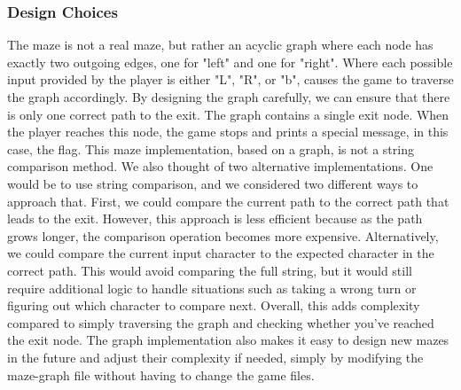



\subsubsection{Design Choices}

The maze is not a real maze, but rather an acyclic graph where each node has exactly two outgoing edges, one for "left" and one for "right". Where each possible input provided by the player is either "L", "R", or "b", causes the game to traverse the graph accordingly. By designing the graph carefully, we can ensure that there is only one correct path to the exit. The graph contains a single exit node. When the player reaches this node, the game stops and prints a special message, in this case, the flag. This maze implementation, based on a graph, is not a string comparison method. We also thought of two alternative implementations. One would be to use string comparison, and we considered two different ways to approach that. First, we could compare the current path to the correct path that leads to the exit. However, this approach is less efficient because as the path grows longer, the comparison operation becomes more expensive. Alternatively, we could compare the current input character to the expected character in the correct path. This would avoid comparing the full string, but it would still require additional logic to handle situations such as taking a wrong turn or figuring out which character to compare next. Overall, this adds complexity compared to simply traversing the graph and checking whether you've reached the exit node. The graph implementation also makes it easy to design new mazes in the future and adjust their complexity if needed, simply by modifying the maze-graph file without having to change the game files.

